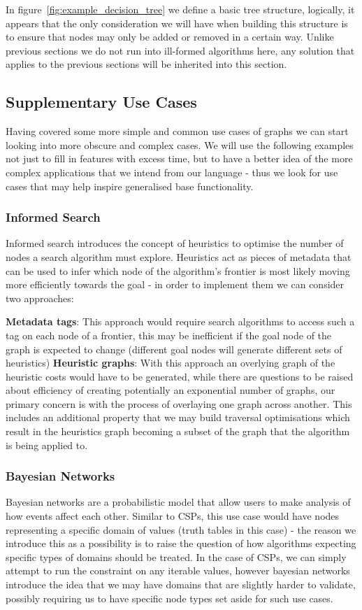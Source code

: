 In figure~\ref{fig:example_decision_tree} we define a basic tree structure, logically, it appears that the only
consideration we will have when building this structure is to ensure that nodes may only be added or removed in a
certain way.
Unlike previous sections we do not run into ill-formed algorithms here, any solution that applies to the previous
sections will be inherited into this section.

\subsection{Supplementary Use Cases}\label{subsec:supplementary-use-cases}
Having covered some more simple and common use cases of graphs we can start looking into more obscure and complex
cases.
We will use the following examples not just to fill in features with excess time, but to have a better idea of the
more complex applications that we intend from our language - thus we look for use cases that may help inspire
generalised base functionality.

\subsubsection{Informed Search}
Informed search introduces the concept of heuristics to optimise the number of nodes a search algorithm must explore.
Heuristics act as pieces of metadata that can be used to infer which node of the algorithm's frontier is most likely 
moving more efficiently towards the goal - in order to implement them we can consider two approaches:

\textbf{Metadata tags}: This approach would require search algorithms to access such a tag on each node of a frontier,
this may be inefficient if the goal node of the graph is expected to change (different goal nodes will generate
different sets of heuristics)
\textbf{Heuristic graphs}: With this approach an overlying graph of the heuristic costs would have to be generated,
while there are questions to be raised about efficiency of creating potentially an exponential number of graphs, our
primary concern is with the process of overlaying one graph across another.
This includes an additional property that we may build traversal optimisations which result in the heuristics graph
becoming a subset of the graph that the algorithm is being applied to.

\subsubsection{Bayesian Networks}
Bayesian networks are a probabilistic model that allow users to make analysis of how events affect each other.
Similar to CSPs, this use case would have nodes representing a specific domain of values (truth tables in this case) -
the reason we introduce this as a possibility is to raise the question of how algorithms expecting specific types of
domains should be treated.
In the case of CSPs, we can simply attempt to run the constraint on any iterable values, however bayesian networks
introduce the idea that we may have domains that are slightly harder to validate, possibly requiring us to have
specific node types set aside for such use cases.

